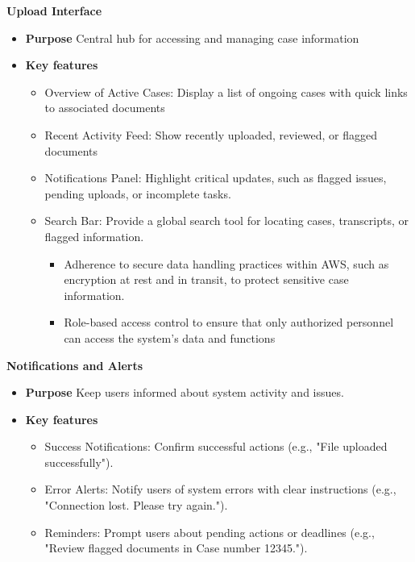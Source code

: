 \documentclass[12pt]{article}
\begin{document}
\textbf{  Upload Interface}
\begin{itemize}
  \item \textbf{Purpose} Central hub for accessing and managing case information
  \item \textbf{Key features}   
	\begin{itemize}
		\item  Overview of Active Cases: Display a list of ongoing cases with quick links to associated
 documents
		\item Recent Activity Feed: Show recently uploaded, reviewed, or flagged documents
		\item  Notifications Panel: Highlight critical updates, such as flagged issues, pending uploads,
 or incomplete tasks.
		\item Search Bar: Provide a global search tool for locating cases, transcripts, or flagged
 information.
		\begin{itemize}
			\item    Adherence to secure data handling practices within AWS, such as encryption at rest and in transit, to protect sensitive case information.
			\item Role-based access control to ensure that only authorized personnel can access the system’s data and functions
		\end{itemize}
	\end{itemize}
\end{itemize}

\textbf{  Notifications and Alerts}
\begin{itemize}
  \item \textbf{Purpose}  Keep users informed about system activity and issues.
  \item \textbf{Key features}   
	\begin{itemize}
		\item   Success Notifications: Confirm successful actions (e.g., "File uploaded successfully").
		\item Error Alerts: Notify users of system errors with clear instructions (e.g., "Connection lost.
 Please try again.").
		\item   Reminders: Prompt users about pending actions or deadlines (e.g., "Review flagged
 documents in Case number 12345.").

	\end{itemize}
\end{itemize}
\end{document}
